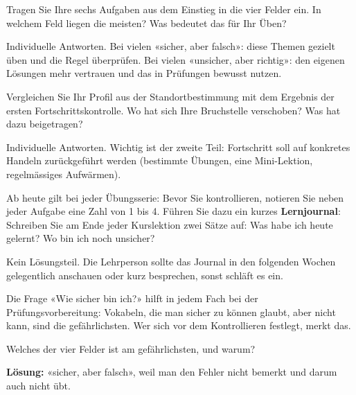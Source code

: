 \documentclass[11pt]{exam}
\begin{document}
\begin{questions}

\question Tragen Sie Ihre sechs Aufgaben aus dem Einstieg in die vier Felder
ein. In welchem Feld liegen die meisten? Was bedeutet das für Ihr Üben?
\begin{solution}
  Individuelle Antworten. Bei vielen «sicher, aber falsch»: diese Themen
  gezielt üben und die Regel überprüfen. Bei vielen «unsicher, aber richtig»:
  den eigenen Lösungen mehr vertrauen und das in Prüfungen bewusst nutzen.
\end{solution}
\zeilen{3cm}

\question Vergleichen Sie Ihr Profil aus der Standortbestimmung mit dem
Ergebnis der ersten Fortschrittskontrolle. Wo hat sich Ihre Bruchstelle
verschoben? Was hat dazu beigetragen?
\begin{solution}
  Individuelle Antworten. Wichtig ist der zweite Teil: Fortschritt soll auf
  konkretes Handeln zurückgeführt werden (bestimmte Übungen, eine
  Mini-Lektion, regelmässiges Aufwärmen).
\end{solution}
\zeilen{4cm}

\question Ab heute gilt bei jeder Übungsserie: Bevor Sie kontrollieren,
notieren Sie neben jeder Aufgabe eine Zahl von 1 bis 4. Führen Sie dazu ein
kurzes \textbf{Lernjournal}: Schreiben Sie am Ende jeder Kurslektion zwei
Sätze auf: Was habe ich heute gelernt? Wo bin ich noch unsicher?
\begin{solution}
  Kein Lösungsteil. Die Lehrperson sollte das Journal in den folgenden Wochen
  gelegentlich anschauen oder kurz besprechen, sonst schläft es ein.
\end{solution}

\end{questions}

\begin{transfer}
Die Frage «Wie sicher bin ich?» hilft in jedem Fach bei der
Prüfungsvorbereitung: Vokabeln, die man sicher zu können glaubt, aber nicht
kann, sind die gefährlichsten. Wer sich vor dem Kontrollieren festlegt,
merkt das.
\end{transfer}

\begin{exitfrage}
Welches der vier Felder ist am gefährlichsten, und warum?
\ifprintanswers\par\medskip\textbf{Lösung:} «sicher, aber falsch», weil man
den Fehler nicht bemerkt und darum auch nicht übt.
\else\par\vspace{1.5cm}\fi
\end{exitfrage}
\end{document}
